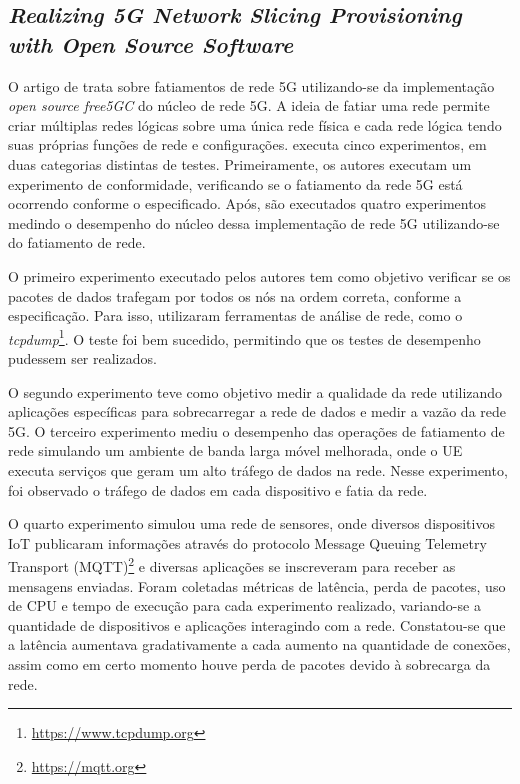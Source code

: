 \subsection{\textit{Realizing 5G Network Slicing Provisioning with Open Source Software}}

O artigo de \cite{Lee2021} trata sobre fatiamentos de rede 5G utilizando-se da implementação \textit{open source free5GC} do núcleo de rede 5G.
A ideia de fatiar uma rede permite criar múltiplas redes lógicas sobre uma única rede física e cada rede lógica tendo suas próprias funções de rede e configurações.
\cite{Lee2021} executa cinco experimentos, em duas categorias distintas de testes. Primeiramente, os autores executam um experimento de conformidade, verificando se o fatiamento da rede 5G está ocorrendo conforme o especificado. Após, são executados quatro experimentos medindo o desempenho do núcleo dessa implementação de rede 5G utilizando-se do fatiamento de rede.

O primeiro experimento executado pelos autores tem como objetivo verificar se os pacotes de dados trafegam por todos os nós na ordem correta, conforme a especificação.
Para isso, utilizaram ferramentas de análise de rede, como o \textit{tcpdump}\footnote{\url{https://www.tcpdump.org}}.
O teste foi bem sucedido, permitindo que os testes de desempenho pudessem ser realizados.

O segundo experimento teve como objetivo medir a qualidade da rede utilizando aplicações específicas para sobrecarregar a rede de dados e medir a vazão da rede 5G.
O terceiro experimento mediu o desempenho das operações de fatiamento de rede simulando um ambiente de banda larga móvel melhorada, onde o UE executa serviços que geram um alto tráfego de dados na rede.
Nesse experimento, foi observado o tráfego de dados em cada dispositivo e fatia da rede.

O quarto experimento simulou uma rede de sensores, onde diversos dispositivos IoT publicaram informações através do protocolo Message Queuing Telemetry Transport (MQTT)\footnote{\url{https://mqtt.org}} e diversas aplicações se inscreveram para receber as mensagens enviadas.
Foram coletadas métricas de latência, perda de pacotes, uso de CPU e tempo de execução para cada experimento realizado, variando-se a quantidade de dispositivos e aplicações interagindo com a rede.
Constatou-se que a latência aumentava gradativamente a cada aumento na quantidade de conexões, assim como em certo momento houve perda de pacotes devido à sobrecarga da rede.


